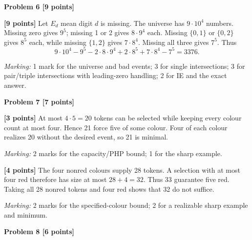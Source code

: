 \documentclass[12pt,letterpaper]{article}
\newcommand{\problemheading}[2][5\baselineskip]{\Needspace{#1}\par\noindent\hspace*{-0.625in}\textbf{#2}\par\nobreak\vspace{0.3em}}
\begin{document}
\vspace{0.65em}
\problemheading[\dimexpr 3\baselineskip+4\baselineskip\relax]{Problem 6 [9 points]}
\begin{description}[font=\normalfont,leftmargin=1.2em,labelsep=0.4em]
\item[] \textbf{[9 points]} Let $E_d$ mean digit $d$ is missing. The universe has $9\cdot10^4$ numbers. Missing zero gives $9^5$; missing 1 or 2 gives $8\cdot9^4$ each. Missing $\{0,1\}$ or $\{0,2\}$ gives $8^5$ each, while missing $\{1,2\}$ gives $7\cdot8^4$. Missing all three gives $7^5$. Thus\[9\cdot10^4-9^5-2\cdot8\cdot9^4+2\cdot8^5+7\cdot8^4-7^5=3376.\]
\par\textit{Marking:} 1 mark for the universe and bad events; 3 for single intersections; 3 for pair/triple intersections with leading-zero handling; 2 for IE and the exact answer.
\end{description}
\vspace{0.65em}
\problemheading[\dimexpr 3\baselineskip+4\baselineskip\relax]{Problem 7 [7 points]}
\begin{description}[font=\normalfont,leftmargin=1.2em,labelsep=0.4em]
\item[(a)] \textbf{[3 points]} At most $4\cdot5=20$ tokens can be selected while keeping every colour count at most four. Hence 21 force five of some colour. Four of each colour realizes 20 without the desired event, so 21 is minimal.
\par\textit{Marking:} 2 marks for the capacity/PHP bound; 1 for the sharp example.
\item[(b)] \textbf{[4 points]} The four nonred colours supply 28 tokens. A selection with at most four red therefore has size at most $28+4=32$. Thus 33 guarantee five red. Taking all 28 nonred tokens and four red shows that 32 do not suffice.
\par\textit{Marking:} 2 marks for the specified-colour bound; 2 for a realizable sharp example and minimum.
\end{description}
\vspace{0.65em}
\problemheading[\dimexpr 3\baselineskip+4\baselineskip\relax]{Problem 8 [6 points]}
\end{document}
